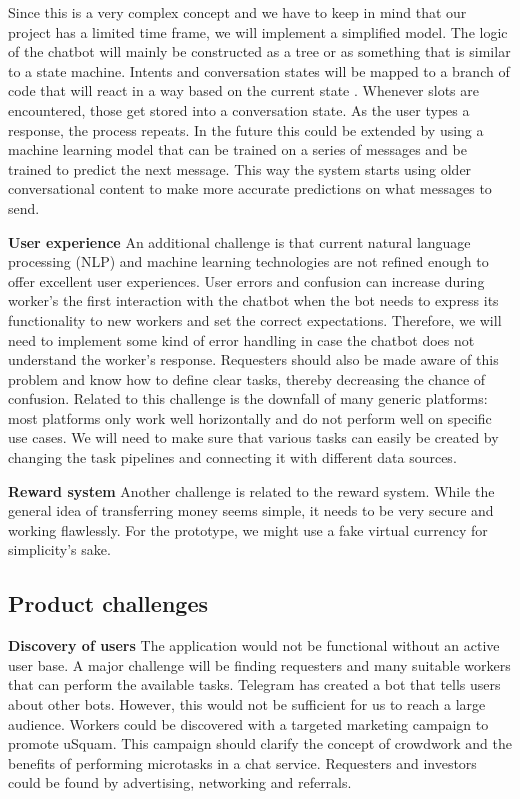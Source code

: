 \documentclass[a4paper,dutch,fleqn]{exam}
\begin{document}
Since this is a very complex concept and we have to keep in mind that our project has a limited time frame, we will implement a simplified model. The logic of the chatbot will mainly be constructed as a tree or as something that is similar to a state machine. Intents and conversation states will be mapped to a branch of code that will react in a way based on the current state \cite{states}. Whenever slots are encountered, those get stored into a conversation state. As the user types a response, the process repeats. In the future this could be extended by using a machine learning model that can be trained on a series of messages and be trained to predict the next message. This way the system starts using older conversational content to make more accurate predictions on what messages to send.

\textbf{User experience}
An additional challenge is that current natural language processing (NLP) and machine learning technologies are not refined enough to offer excellent user experiences. User errors and confusion can increase during worker's the first interaction with the chatbot when the bot needs to express its functionality to new workers and set the correct expectations. Therefore, we will need to implement some kind of error handling in case the chatbot does not understand the worker's response. Requesters should also be made aware of this problem and know how to define clear tasks, thereby decreasing the chance of confusion. Related to this challenge is the downfall of many generic platforms: most platforms only work well horizontally and do not perform well on specific use cases. We will need to make sure that various tasks can easily be created by changing the task pipelines and connecting it with different data sources. 

\textbf{Reward system}
Another challenge is related to the reward system. While the general idea of transferring money seems simple, it needs to be very secure and working flawlessly. For the prototype, we might use a fake virtual currency for simplicity's sake.

\subsection{Product challenges}
\textbf{Discovery of users}
The application would not be functional without an active user base. A major challenge will be finding requesters and many suitable workers that can perform the available tasks. Telegram has created a bot that tells users about other bots. However, this would not be sufficient for us to reach a large audience. Workers could be discovered with a targeted marketing campaign to promote uSquam. This campaign should clarify the concept of crowdwork and the benefits of performing microtasks in a chat service. Requesters and investors could be found by advertising, networking and referrals.
\end{document}

